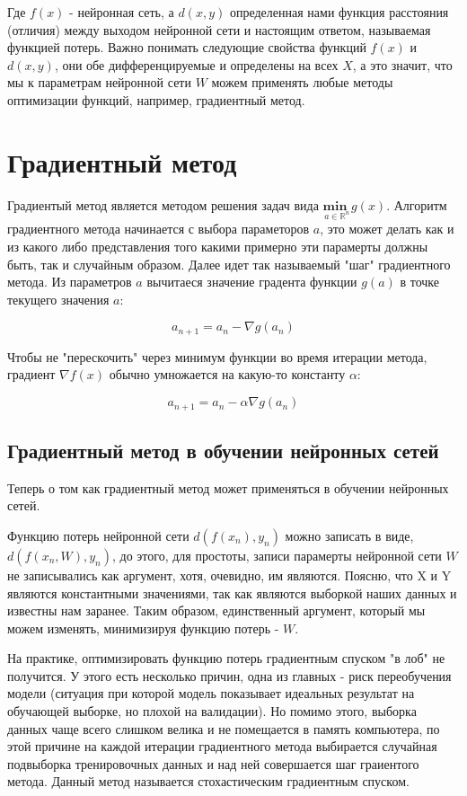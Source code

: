 \documentclass[a4paper]{report}
\begin{document}
Где $f(x)$ - нейронная сеть, а $d(x, y)$ определенная нами функция расстояния (отличия) между выходом нейронной сети и настоящим ответом, называемая функцией потерь.
Важно понимать следующие свойства функций $f(x)$ и $d(x, y)$, они обе дифференцируемые и определены на всех $X$, а это значит, что мы к параметрам нейронной сети $W$ можем
применять любые методы оптимизации функций, например, градиентный метод.

\section{Градиентный метод}
Градиентый метод является методом решения задач вида $\underset{a \in \mathds{R}^n}{\textbf{min }} g(x)$. Алгоритм градиентного метода начинается с выбора
параметоров $a$, это может делать как и из какого либо представления того какими примерно эти парамерты должны быть, так и случайным образом. Далее
идет так называемый "шаг" градиентного метода. Из параметров $a$ вычитаеся значение градента функции $g(a)$ в точке текущего значения $a$:

$$ a_{n + 1} = a_n - \nabla g(a_n)$$

Чтобы не "перескочить" через минимум функции во время итерации метода, градиент $\nabla f(x)$ обычно умножается на какую-то константу $\alpha$:

$$ a_{n + 1} = a_n - \alpha \nabla g(a_n)$$

\subsection{Градиентный метод в обучении нейронных сетей}
Теперь о том как градиентный метод может применяться в обучении нейронных сетей.

Функцию потерь нейронной сети $d(f(x_n), y_n)$ можно записать в виде, $d(f(x_n, W), y_n)$, до этого, для простоты, записи парамерты нейронной сети $W$ не записывались
как аргумент, хотя, очевидно, им являются. Поясню, что X и Y являются константными значениями, так как являются выборкой наших
данных и известны нам заранее. Таким образом, единственный аргумент, который мы можем изменять, минимизируя функцию потерь - $W$.

На практике, оптимизировать функцию потерь градиентным спуском "в лоб" не получится. У этого есть несколько причин, одна из главных - риск переобучения
модели (ситуация при которой модель показывает идеальных результат на обучающей выборке, но плохой на валидации). Но помимо этого, выборка данных
чаще всего слишком велика и не помещается в память компьютера, по этой причине на каждой итерации градиентного метода выбирается случайная подвыборка
тренировочных данных и над ней совершается шаг граиентого метода. Данный метод называется стохастическим градиентным спуском.
\end{document}
